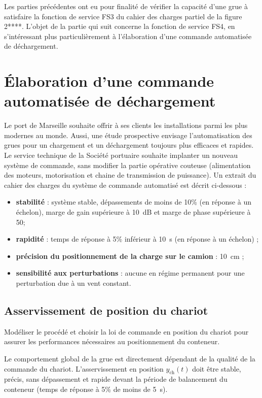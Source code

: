 \documentclass[10pt,fleqn]{article} %
\begin{document}
Les parties précédentes ont eu pour finalité de vérifier la capacité d’une grue à satisfaire la fonction de service
FS3 du cahier des charges partiel de la figure 2****. L’objet de la partie qui suit concerne la fonction de service FS4,
en s’intéressant plus particulièrement à l’élaboration d’une commande automatisée de déchargement.

\section{Élaboration d’une commande automatisée de déchargement}

Le port de Marseille souhaite offrir à ses clients les installations parmi les plus modernes au monde. Aussi,
une étude prospective envisage l’automatisation des grues pour un chargement et un déchargement toujours
plus efficaces et rapides. Le service technique de la Société portuaire souhaite implanter un nouveau système
de commande, sans modifier la partie opérative couteuse (alimentation des moteurs, motorisation et chaine de
transmission de puissance).
Un extrait du cahier des charges du système de commande automatisé est décrit ci-dessous :
\begin{itemize}
\item \textbf{stabilité} : système stable, dépassements de moins de 10\% (en réponse à un échelon), marge de gain supérieure
à \SI{10}{dB} et marge de phase supérieure à 50\degres ;
\item \textbf{rapidité} : temps de réponse à 5\% inférieur à \SI{10}{s} (en réponse à un échelon) ;
\item \textbf{précision du positionnement de la charge sur le camion} :  \SI{10}{cm} ;
\item \textbf{sensibilité aux perturbations} : aucune en régime permanent pour une perturbation due à un vent
constant.
\end{itemize}

\subsection{Asservissement de position du chariot}

\begin{obj}
Modéliser le procédé et choisir la loi de commande en position du chariot pour assurer les performances
nécessaires au positionnement du conteneur.
\end{obj}

Le comportement global de la grue est directement dépendant de la qualité de la commande du chariot. L’asservissement
en position $y_{\text{ch}}(t)$ doit être stable, précis, sans dépassement et rapide devant la période de balancement
du conteneur (temps de réponse à 5\% de moins de \SI{5}{s}).
\end{document}
